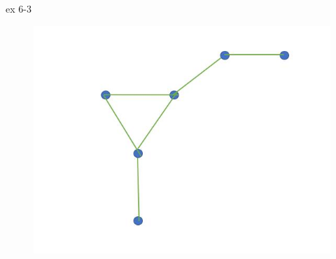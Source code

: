 \begin{exercise}


ex 6-3


\end{exercise}



\begin{figure}[hpbt]


\begin{center}


    \includegraphics[width=0.3 \textwidth]{lym.png}


\end{center}


\end{figure}
